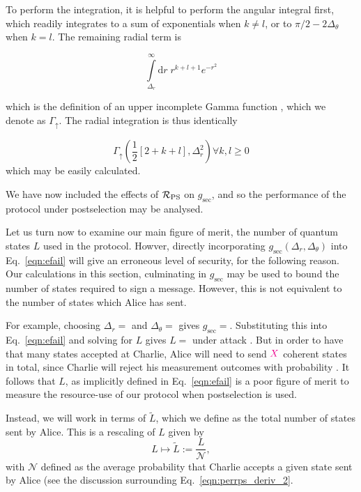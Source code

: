 \noindent To perform the integration, it is helpful to perform the angular integral first, which readily integrates to a sum of exponentials when $k \ne l$, or to $\pi/2 - 2\Delta_\theta$ when $k=l$. The remaining radial term is

\begin{equation}
\int\limits_{\Delta_r}^\infty \mathrm{d}r \; r^{k + l + 1} e^{-r^2}
\end{equation}

\noindent which is the definition of an upper incomplete Gamma function , which we denote as $\Gamma_\uparrow$. The radial integration is thus identically

\begin{equation}
\Gamma_{\uparrow}\left(\frac{1}{2}\left[2 + k + l\right], \Delta_r^2\right)  \forall k, l \ge 0
\end{equation}
which may be easily calculated.

We have now included the effects of $\mathcal{R}_{\text{PS}}$ on $g_{\text{sec}}$, and so the performance of the protocol under postselection may be analysed.


Let us turn now to examine our main figure of merit, the number of quantum states $L$ used in the protocol. Howver, directly incorporating $g_{\text{sec}}\left(\Delta_r, \Delta_\theta\right)$ into Eq.~\ref{eqn:efail} will give an erroneous level of security, for the following reason. Our calculations in this section, culminating in $g_{\text{sec}}$ may be used to bound the number of states required to sign a message. However, this is not equivalent to the number of states which Alice has sent. 

For example, choosing $\Delta_r = $ and $\Delta_\theta = $ gives $g_{\text{sec}} = $. Substituting this into Eq.~\ref{eqn:efail} and solving for $L$ gives $L = $ under attack . But in order to have that many states accepted at Charlie, Alice will need to send $\textcolor{magenta}{X}$ coherent states in total, since Charlie will reject his measurement outcomes with probability . It follows that $L$, as implicitly defined in Eq.~\ref{eqn:efail} is a poor figure of merit to measure the resource-use of our protocol when postselection is used.

Instead, we will work in terms of $\tilde{L}$, which we define as the total number of states sent by Alice. This is a rescaling of $L$ given by
\begin{equation}
L \mapsto \tilde{L} := \frac{L}{\mathcal{N}},
\end{equation}
with $\mathcal{N}$ defined as the average probability that Charlie accepts a given state sent by Alice (see the discussion surrounding Eq.~\ref{eqn:perrps_deriv_2}. 

